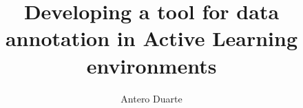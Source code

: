 \title{Developing a tool for data annotation in Active Learning environments}
\author{Antero Duarte}







